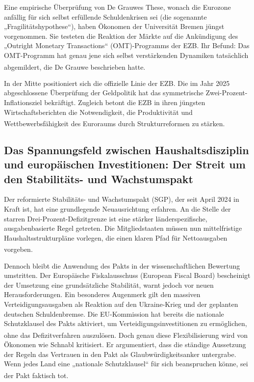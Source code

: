 \documentclass[12pt,a4paper]{article}
\newcommand{\footcite}[1]{\textsuperscript{\cite{#1}}}
\begin{document}
	Eine empirische Überprüfung von De Grauwes These, wonach die Eurozone anfällig für sich selbst erfüllende Schuldenkrisen sei (die sogenannte „Fragilitätshypothese“), haben Ökonomen der Universität Bremen jüngst vorgenommen. Sie testeten die Reaktion der Märkte auf die Ankündigung des „Outright Monetary Transactions“ (OMT)-Programms der EZB. Ihr Befund: Das OMT-Programm hat genau jene sich selbst verstärkenden Dynamiken tatsächlich abgemildert, die De Grauwe beschrieben hatte.\footcite{Bremen2023}
	
	In der Mitte positioniert sich die offizielle Linie der EZB. Die im Jahr 2025 abgeschlossene Überprüfung der Geldpolitik hat das symmetrische Zwei-Prozent-Inflationsziel bekräftigt. Zugleich betont die EZB in ihren jüngsten Wirtschaftsberichten die Notwendigkeit, die Produktivität und Wettbewerbsfähigkeit des Euroraums durch Strukturreformen zu stärken.\footcite{ECBBulletin2025}
	
	\subsection{Das Spannungsfeld zwischen Haushaltsdisziplin und europäischen Investitionen: Der Streit um den Stabilitäts- und Wachstumspakt}
	
	Der reformierte Stabilitäts- und Wachstumspakt (SGP), der seit April 2024 in Kraft ist, hat eine grundlegende Neuausrichtung erfahren. An die Stelle der starren Drei-Prozent-Defizitgrenze ist eine stärker länderspezifische, ausgabenbasierte Regel getreten. Die Mitgliedstaaten müssen nun mittelfristige Haushaltsstrukturpläne vorlegen, die einen klaren Pfad für Nettoausgaben vorgeben.\footcite{EPRS2025}
	
	Dennoch bleibt die Anwendung des Pakts in der wissenschaftlichen Bewertung umstritten. Der Europäische Fiskalausschuss (European Fiscal Board) bescheinigt der Umsetzung eine grundsätzliche Stabilität, warnt jedoch vor neuen Herausforderungen. Ein besonderes Augenmerk gilt den massiven Verteidigungsausgaben als Reaktion auf den Ukraine-Krieg und der geplanten deutschen Schuldenbremse. Die EU-Kommission hat bereits die nationale Schutzklausel des Pakts aktiviert, um Verteidigungsinvestitionen zu ermöglichen, ohne das Defizitverfahren auszulösen.\footcite{Zenodo2026} Doch genau diese Flexibilisierung wird von Ökonomen wie Schnabl kritisiert. Er argumentiert, dass die ständige Aussetzung der Regeln das Vertrauen in den Pakt als Glaubwürdigkeitsanker untergrabe. Wenn jedes Land eine „nationale Schutzklausel“ für sich beanspruchen könne, sei der Pakt faktisch tot.\footcite{Schnabl2025a}
	
\end{document}
